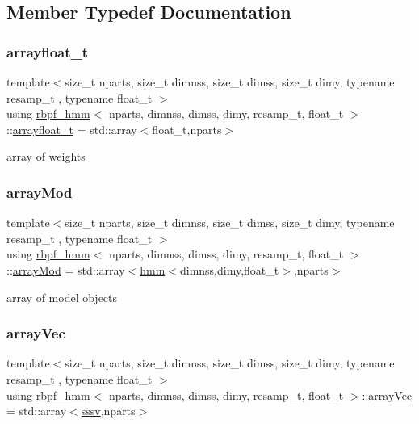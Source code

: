 \subsection{Member Typedef Documentation}
\mbox{\label{classrbpf__hmm_aae4e776097278c6e5c25f614d7cad7bd}} 
\subsubsection{\texorpdfstring{arrayfloat\+\_\+t}{arrayfloat\_t}}
{\footnotesize\ttfamily template$<$size\+\_\+t nparts, size\+\_\+t dimnss, size\+\_\+t dimss, size\+\_\+t dimy, typename resamp\+\_\+t , typename float\+\_\+t $>$ \\
using \hyperlink{classrbpf__hmm}{rbpf\+\_\+hmm}$<$ nparts, dimnss, dimss, dimy, resamp\+\_\+t, float\+\_\+t $>$\+::\hyperlink{classrbpf__hmm_aae4e776097278c6e5c25f614d7cad7bd}{arrayfloat\+\_\+t} =  std\+::array$<$float\+\_\+t,nparts$>$}

array of weights \mbox{\label{classrbpf__hmm_a6dad2eb9cecbc6a85e348fec442c2998}} 
\subsubsection{\texorpdfstring{array\+Mod}{arrayMod}}
{\footnotesize\ttfamily template$<$size\+\_\+t nparts, size\+\_\+t dimnss, size\+\_\+t dimss, size\+\_\+t dimy, typename resamp\+\_\+t , typename float\+\_\+t $>$ \\
using \hyperlink{classrbpf__hmm}{rbpf\+\_\+hmm}$<$ nparts, dimnss, dimss, dimy, resamp\+\_\+t, float\+\_\+t $>$\+::\hyperlink{classrbpf__hmm_a6dad2eb9cecbc6a85e348fec442c2998}{array\+Mod} =  std\+::array$<$\hyperlink{classhmm}{hmm}$<$dimnss,dimy,float\+\_\+t$>$,nparts$>$}

array of model objects \mbox{\label{classrbpf__hmm_a2154906d47b4eb987fe7c238d1aace0a}} 
\subsubsection{\texorpdfstring{array\+Vec}{arrayVec}}
{\footnotesize\ttfamily template$<$size\+\_\+t nparts, size\+\_\+t dimnss, size\+\_\+t dimss, size\+\_\+t dimy, typename resamp\+\_\+t , typename float\+\_\+t $>$ \\
using \hyperlink{classrbpf__hmm}{rbpf\+\_\+hmm}$<$ nparts, dimnss, dimss, dimy, resamp\+\_\+t, float\+\_\+t $>$\+::\hyperlink{classrbpf__hmm_a2154906d47b4eb987fe7c238d1aace0a}{array\+Vec} =  std\+::array$<$\hyperlink{classrbpf__hmm_a28e8ad1d93bcf53cb74603f74826a81c}{sssv},nparts$>$}

